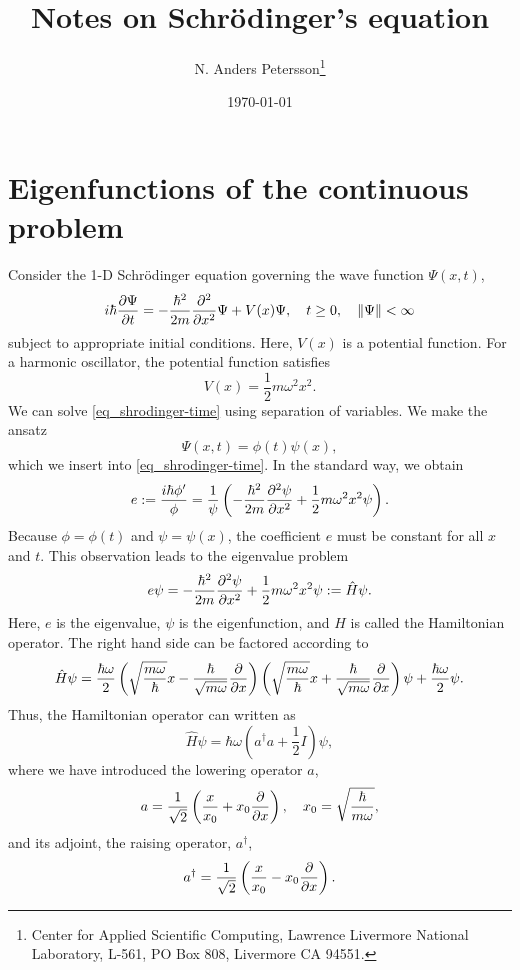 \documentclass[11pt]{article}
\begin{document}
\title{Notes on Schr\"odinger's equation}

\author{N. Anders Petersson\thanks{Center for Applied
    Scientific Computing, Lawrence Livermore National Laboratory, L-561, PO Box 808, Livermore CA
    94551. }}

\date{\today}

\maketitle

\section{Eigenfunctions of the continuous problem}
 Consider the 1-D Schr\"odinger equation governing the wave function $\Psi(x,t)$,
\begin{equation}\label{eq_shrodinger-time}
i\hbar\frac{\partial \Psi}{\partial t} = -\frac{\hbar^2}{2 m} \frac{\partial^2}{\partial x^2} \Psi + V(x) \Psi,\quad t\geq
0,\quad \| \Psi \| < \infty
\end{equation}
subject to appropriate initial conditions. Here, $V(x)$ is a potential function. For a harmonic
oscillator, the potential function satisfies
\[
V(x) = \frac{1}{2}m\omega^2 x^2.
\]
We can solve \eqref{eq_shrodinger-time} using separation of variables. We make the ansatz
\[
\Psi(x,t) = \phi(t) \psi(x),
\]
which we insert into \eqref{eq_shrodinger-time}. In the standard way, we obtain
\begin{equation} \label{eq_const-ratio}
e:= \frac{i\hbar \phi'}{\phi} = \frac{1}{\psi} \left(-\frac{\hbar^2}{2m} \frac{\partial^2\psi}{\partial x^2} +
\frac{1}{2} m \omega^2 x^2 \psi \right).
\end{equation}
Because $\phi=\phi(t)$ and $\psi=\psi(x)$, the coefficient $e$ must be constant for all $x$ and
$t$. This observation leads to the eigenvalue problem
\begin{equation}\label{eq_eigen-problem}
e\psi = -\frac{\hbar^2}{2m} \frac{\partial^2\psi}{\partial x^2} + \frac{1}{2} m \omega^2 x^2 \psi := \hat{H}\psi.
\end{equation}
Here, $e$ is the eigenvalue, $\psi$ is the eigenfunction, and $\hat{H}$ is called the Hamiltonian
operator. The right hand side can be factored according to
\[
\hat{H}\psi = \frac{\hbar\omega}{2}
%
\left(\sqrt{\frac{m\omega}{\hbar}} x - \frac{\hbar}{\sqrt{m\omega}} \frac{\p}{\p x} \right)
%
\left(\sqrt{\frac{m \omega}{\hbar}} x + \frac{\hbar}{\sqrt{m\omega}} \frac{\p}{\p x} \right) \psi +
%
\frac{\hbar \omega}{2} \psi.
\]
Thus, the Hamiltonian operator can written as
\begin{equation}\label{eq_ladder}
\hat{H}\psi = \hbar\omega\left( a^\dag a + \frac{1}{2} I\right)\psi,
\end{equation}
where we have introduced the lowering operator $a$,
\begin{equation}
  a = \frac{1}{\sqrt{2}} \left(\frac{x}{x_0} + x_0 \frac{\partial}{\partial x} \right),\quad x_0 = \sqrt{\frac{\hbar}{m\omega}},
\end{equation}
and its adjoint, the raising operator, $a^\dag$,
\begin{equation}
  a^\dag= \frac{1}{\sqrt{2}} \left(\frac{x}{x_0} - x_0 \frac{\partial}{\partial x} \right).
\end{equation}
\end{document}
